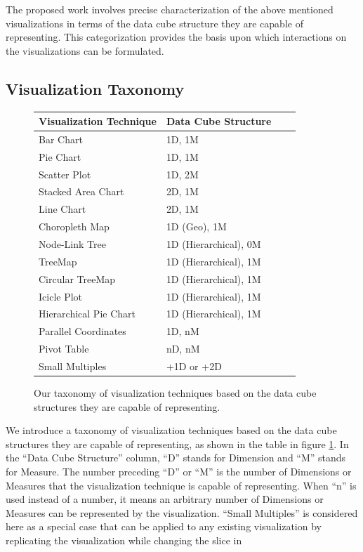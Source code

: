 \documentclass[12pt]{article}
\begin{document}
\begin{doublespace}
The proposed work involves precise characterization of the above mentioned visualizations in terms of the data cube structure they are capable of representing. This categorization provides the basis upon which interactions on the visualizations can be formulated.
\subsection{Visualization Taxonomy}

\begin{figure}[h!]
  \centering
  \begin{tabular}{ | l | l | l | l | }
  \hline
  Visualization Technique & Data Cube Structure \\ \hline
  Bar Chart & 1D, 1M \\ \hline
  Pie Chart & 1D, 1M \\ \hline
  Scatter Plot & 1D, 2M \\ \hline
  Stacked Area Chart & 2D, 1M \\ \hline
  Line Chart & 2D, 1M \\ \hline
  Choropleth Map & 1D (Geo), 1M \\ \hline
  Node-Link Tree & 1D (Hierarchical), 0M \\ \hline
  TreeMap & 1D (Hierarchical), 1M \\ \hline
  Circular TreeMap & 1D (Hierarchical), 1M \\ \hline
  Icicle Plot & 1D (Hierarchical), 1M \\ \hline
  Hierarchical Pie Chart & 1D (Hierarchical), 1M \\ \hline
  Parallel Coordinates & 1D, nM \\ \hline
  Pivot Table & nD, nM \\ \hline
  Small Multiples & +1D or +2D \\ \hline
  \end{tabular}
  \caption[Visualization Taxonomy Table]
   {Our taxonomy of visualization techniques based on the data cube structures they are capable of representing. }
  \label{fig:visTax}
\end{figure}
We introduce a taxonomy of visualization techniques based on the data cube structures they are capable of representing, as shown in the table in figure \ref{fig:visTax}. In the ``Data Cube Structure'' column, ``D'' stands for Dimension and ``M'' stands for Measure. The number preceding ``D'' or ``M'' is the number of Dimensions or Measures that the visualization technique is capable of representing. When ``n'' is used instead of a number, it means an arbitrary number of Dimensions or Measures can be represented by the visualization. ``Small Multiples'' is considered here as a special case that can be applied to any existing visualization by replicating the visualization while changing the slice in 


\end{doublespace}
\end{document}
